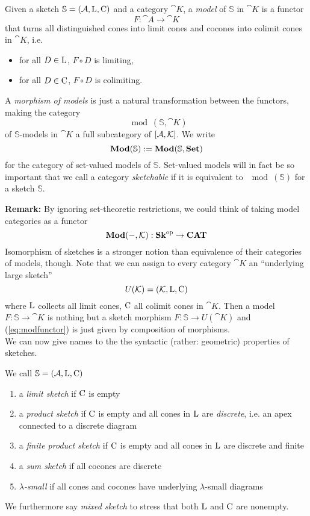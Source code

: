 \begin{Definition}
Given a sketch $\mathbb S = (\mathcal{A}, \textrm{L}, \textrm{C})$ and a category $\cat K$, a \emph{model} of $\mathbb S$ in $\cat K$ is a functor
\[ F : \cat A \to \cat K \]
that turns all distinguished cones into limit cones and cocones into colimit cones in $\cat K$, i.e. \begin{itemize}
\item for all $D \in \textrm{L}$, $F \circ D$ is limiting,
\item for all $D \in \textrm{C}$, $F \circ D$ is colimiting.
\end{itemize}
A \emph{morphism of models} is just a natural transformation between the functors, making the category \[ \mod(\mathbb S, \cat K) \]
of $\mathbb S$-models in $\cat K$ a full subcategory of $[\mathcal{A},\mathcal{K}]$. We write
\[ \mathbf{Mod}(\mathbb S) := \mathbf{Mod}(\mathbb S, \mathbf{Set}) \]
for the category of set-valued models of $\mathbb S$. Set-valued models will in fact be so important that we call a category \emph{sketchable} if it is equivalent to $\mod(\mathbb S)$ for a sketch $\mathbb S$.
\end{Definition}


\textbf{Remark: } By ignoring set-theoretic restrictions, we could think of taking model categories as a functor
\begin{equation}
\label{eq:modfunctor} \mathbf{Mod}(-, \mathcal{K}) : \mathbf{Sk}^{\textrm{op}} \to \mathbf{CAT}
\end{equation}
Isomorphism of sketches is a stronger notion than equivalence of their categories of models, though. Note that we can assign to every category $\cat K$ an ``underlying large sketch'' 
\[ U(\mathcal{K}) = (\mathcal{K}, \textrm{L}, \textrm{C}) \]
where $\textrm{L}$ collects all limit cones, $\textrm{C}$ all colimit cones in $\cat K$. Then a model $F : \mathbb S \to \cat K$ is nothing but a sketch morphism $F : \mathbb S \to U(\cat K)$ and (\ref{eq:modfunctor}) is just given by composition of morphisms. \\

We can now give names to the the syntactic (rather: geometric) properties of sketches.
\begin{Definition}
We call $\mathbb S = (\mathcal{A}, \textrm{L}, \textrm{C})$
\begin{enumerate}
\item a \emph{limit sketch} if $\textrm{C}$ is empty
\item a \emph{product sketch} if $\textrm{C}$ is empty and all cones in $\textrm{L}$ are \emph{discrete}, i.e. an apex connected to a discrete diagram
\item a \emph{finite product sketch} if $\textrm{C}$ is empty and all cones in $\textrm{L}$ are discrete and finite
\item a \emph{sum sketch} if all cocones are discrete
\item \emph{$\lambda$-small} if all cones and cocones have underlying $\lambda$-small diagrams
\end{enumerate}
We furthermore say \emph{mixed sketch} to stress that both $\textrm{L}$ and $\textrm{C}$ are nonempty.
\end{Definition}

